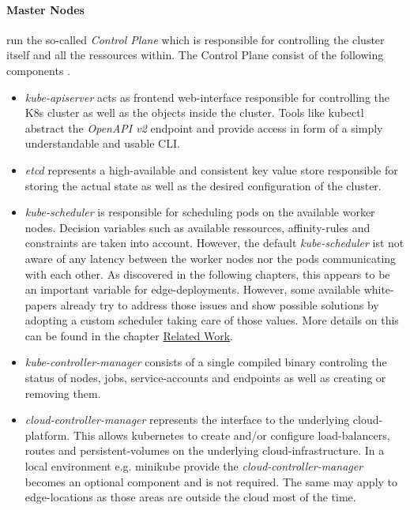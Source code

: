 \documentclass[MSC,Master,english]{twbook}%
\begin{document}
\paragraph{Master Nodes} run the so-called \textit{Control Plane} which is responsible for controlling the cluster itself and all the ressources within. The Control Plane consist of the following components \cite{k8scomp}.
\begin{itemize}
    \item \textit{kube-apiserver} acts as frontend web-interface responsible for controlling the \ac{K8s} cluster as well as the objects inside the cluster. Tools like kubectl abstract the \textit{OpenAPI v2} endpoint and provide access in form of a simply understandable and usable \ac{CLI}. 
    \item \textit{etcd} represents a high-available and consistent key value store responsible for storing the actual state as well as the desired configuration of the cluster.
    \item \textit{kube-scheduler} is responsible for scheduling pods on the available worker nodes. Decision variables such as available ressources, affinity-rules and constraints are taken into account. However, the default \textit{kube-scheduler} ist not aware of any latency between the worker nodes nor the pods communicating with each other. As discovered in the following chapters, this appears to be an important variable for edge-deployments. However, some available white-papers already try to address those issues and show possible solutions by adopting a custom scheduler taking care of those values. More details on this can be found in the chapter \hyperref[chap:related]{Related Work}.
    \item \textit{kube-controller-manager} consists of a single compiled binary controling the status of nodes, jobs, service-accounts and endpoints as well as creating or removing them.
    \item \textit{cloud-controller-manager} represents the interface to the underlying cloud-platform. This allows kubernetes to create and/or configure load-balancers, routes and persistent-volumes on the underlying cloud-infrastructure. In a local environment e.g. minikube \cite{minikube} provide the \textit{cloud-controller-manager} becomes an optional component and is not required. The same may apply to edge-locations as those areas are outside the cloud most of the time.
\end{itemize}
\end{document}
